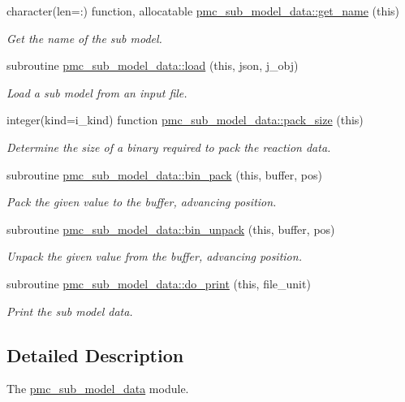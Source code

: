 \begin{DoxyCompactItemize}
\item 
character(len=\+:) function, allocatable \mbox{\hyperlink{namespacepmc__sub__model__data_abb4112b25cd30b34833545bda008a983}{pmc\+\_\+sub\+\_\+model\+\_\+data\+::get\+\_\+name}} (this)
\begin{DoxyCompactList}\small\item\em Get the name of the sub model. \end{DoxyCompactList}\item 
subroutine \mbox{\hyperlink{namespacepmc__sub__model__data_a86c095dd6877245396aa7313674e462e}{pmc\+\_\+sub\+\_\+model\+\_\+data\+::load}} (this, json, j\+\_\+obj)
\begin{DoxyCompactList}\small\item\em Load a sub model from an input file. \end{DoxyCompactList}\item 
integer(kind=i\+\_\+kind) function \mbox{\hyperlink{namespacepmc__sub__model__data_ae6c19a335b730ac8a36548c74df62c73}{pmc\+\_\+sub\+\_\+model\+\_\+data\+::pack\+\_\+size}} (this)
\begin{DoxyCompactList}\small\item\em Determine the size of a binary required to pack the reaction data. \end{DoxyCompactList}\item 
subroutine \mbox{\hyperlink{namespacepmc__sub__model__data_a1432364c7373b5b48e8251cef83cdcfe}{pmc\+\_\+sub\+\_\+model\+\_\+data\+::bin\+\_\+pack}} (this, buffer, pos)
\begin{DoxyCompactList}\small\item\em Pack the given value to the buffer, advancing position. \end{DoxyCompactList}\item 
subroutine \mbox{\hyperlink{namespacepmc__sub__model__data_a2cdea3a37ab472a7095932175ddba75c}{pmc\+\_\+sub\+\_\+model\+\_\+data\+::bin\+\_\+unpack}} (this, buffer, pos)
\begin{DoxyCompactList}\small\item\em Unpack the given value from the buffer, advancing position. \end{DoxyCompactList}\item 
subroutine \mbox{\hyperlink{namespacepmc__sub__model__data_aa1a6115c9e5f44ce5e6716748ba06072}{pmc\+\_\+sub\+\_\+model\+\_\+data\+::do\+\_\+print}} (this, file\+\_\+unit)
\begin{DoxyCompactList}\small\item\em Print the sub model data. \end{DoxyCompactList}\end{DoxyCompactItemize}


\subsection{Detailed Description}
The \mbox{\hyperlink{namespacepmc__sub__model__data}{pmc\+\_\+sub\+\_\+model\+\_\+data}} module. 


